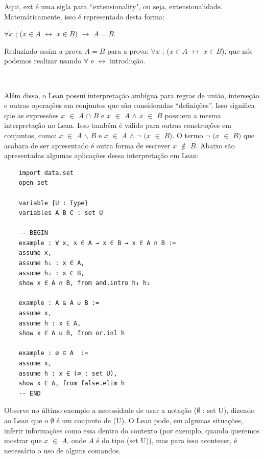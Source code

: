 Aqui, {
\selectfont ext} é uma sigla para ``extensionality", ou seja, extensionalidade. Matemáticamente, isso é representado desta forma:

\begin{center}
    $\forall x$ ; ($x \in A$ $\leftrightarrow$ $x \in B$) $\rightarrow$ $A = B$.  
\end{center}

Reduzindo assim a prova $A = B$ para a prova: $\forall x$ ; ($x \in A$ $\leftrightarrow$ $x \in B$), que nós podemos realizar usando $\forall$ e $\leftrightarrow$ introdução.

$\qquad$

Além disso, o Lean possui interpretação ambígua para regras de união, interseção e outras operações em conjuntos que são consideradas “definições”. Isso significa que as expressões $x$ $\in$ $A$ $\cap$ $B$ e $x$ $\in$ $A$ $\wedge$ $x$ $\in$ $B$ possuem a mesma interpretação no Lean. Isso também é válido para outras construções em conjuntos, como: $x$ $\in$ $A$ $\backslash $ $B$ e $x$ $\in$ $A$ $\wedge$ $\neg$ $(x$ $\in$ $B)$. O termo $\neg$ $(x$ $\in$ $B)$ que acabara de ser apresentado é outra forma de escrever $x$ $\notin$ $B$. Abaixo são apresentadas algumas aplicações dessa interpretação em Lean:

\begin{lstlisting}
    import data.set
    open set

    variable {U : Type}
    variables A B C : set U

    -- BEGIN
    example : ∀ x, x ∈ A → x ∈ B → x ∈ A ∩ B :=
    assume x,
    assume h₁ : x ∈ A,
    assume h₂ : x ∈ B,
    show x ∈ A ∩ B, from and.intro h₁ h₂

    example : A ⊆ A ∪ B :=
    assume x,
    assume h : x ∈ A,
    show x ∈ A ∪ B, from or.inl h

    example : ∅ ⊆ A  :=
    assume x,
    assume h : x ∈ (∅ : set U),
    show x ∈ A, from false.elim h
    -- END

\end{lstlisting}

Observe no último exemplo a necessidade de usar a notação {
\selectfont ($\emptyset$ : set U)}, dizendo ao Lean que o $\emptyset$ é um conjunto de {
\selectfont (U)}. O Lean pode, em algumas situações, inferir informações como essa dentro do contexto (por exemplo, quando queremos mostrar que $x$ $\in$ $A$, onde $A$ é do tipo {
\selectfont (set U)}), mas para isso acontecer, é necessário o uso de alguns comandos.

